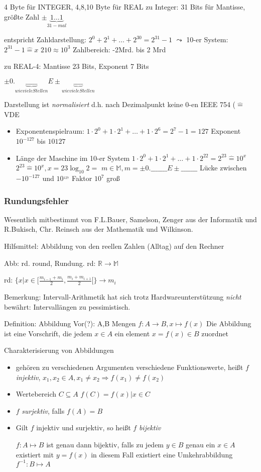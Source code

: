 \documentclass[a4paper,10pt]{book}
\begin{document}
4 Byte für INTEGER, 4,8,10 Byte für REAL
zu Integer: 31 Bits für Mantisse, größte Zahl $\pm \underbrace{1\ldots1}_{31-mal}$

entspricht Zahldarstellung: $2^0+2^1+\ldots+2^{30}=2^{31}-1$
$\leadsto$ 10-er System: $2^{31}-1 \hat{=} x$ $2{10}\approx 10^3$
Zahlbereich: -2Mrd. bis 2 Mrd

zu REAL-4: Mantisse 23 Bits, Exponent 7 Bits

$\pm 0.\underbrace{\_\_\_\_\_}_{wieviele Stellen}E\pm\underbrace{\_\_\_\_}_{wieviele Stellen}$

Darstellung ist \emph{normalisiert} d.h. nach Dezimalpunkt keine 0-en
IEEE 754 ($\hat{=}$ VDE
\begin{itemize}
 \item Exponentenspielraum: $1\cdot 2^0+1\cdot2^1+\ldots+1\cdot2^6 = 2^7 -1 = 127$
  Exponent $10^{-127}$ bis $10{127}$
 \item Länge der Maschine im 10-er System
$1\cdot 2^0+1\cdot2^1+\ldots+1\cdot2^22=2^{23} \hat{=} 10^x$
$2^{23}\hat{=}10^x, x=23 \log_10 2 = $
$m \in \mathbb{M}, m=\pm 0.\_\_\_\_\_\_\_E\pm \_\_\_\_\_\_\_$ Lücke zwischen $-10^{-127}$ und $10^{_127}$ Faktor $10^7$ groß
\end{itemize}

\subsubsection{Rundungsfehler}

Wesentlich mitbestimmt von F.L.Bauer, Samelson, Zenger aus der Informatik und R.Bukisch, Chr. Reinsch aus der Mathematik und Wilkinson.

Hilfsmittel: Abbildung von den reellen Zahlen (Alltag) auf den Rechner

Abb: rd. round, Rundung. rd: $\mathbb{R}\rightarrow\mathbb{M}$

rd: $\{x|x \in [\frac{m_{i-1}+m_i}{2},\frac{m_{i}+m_{i+1}}{2}[\} \rightarrow m_i$

Bemerkung: Intervall-Arithmetik hat sich trotz Hardwareunterstützung \emph{nicht} bewährt: Intervallängen zu pessimistisch.

Definition: Abbildung
Vor(?): A,B Mengen
$f: A \rightarrow B, x \mapsto f(x)$
Die Abbildung ist eine Vorschrift, die jedem $x \in A$ ein element $x=f(x) \in B$ zuordnet

Charakterisierung von Abbildungen
\begin{itemize}
 \item gehören zu verschiedenen Argumenten verschiedene Funktionswerte, heißt $f$ \emph{injektiv},
$x_1,x_2 \in A, x_1 \neq x_2 \Rightarrow f(x_1) \neq f(x_2)$
 \item Wertebereich $C \subseteq A$
$f(C) = {f(x)|x\in C}$
 \item $f$ \emph{surjektiv}, falls $f(A)=B$
 \item Gilt $f$ injektiv und surjektiv, so heißt $f$ \emph{bijektiv}

$f: A \mapsto B$ ist genau dann bijektiv, falls zu jedem $y \in B$ genau ein $x \in A $ existiert mit $y=f(x)$ in diesem Fall existiert eine Umkehrabbildung $f^{-1}: B \mapsto A$
\end{itemize}
\end{document}
